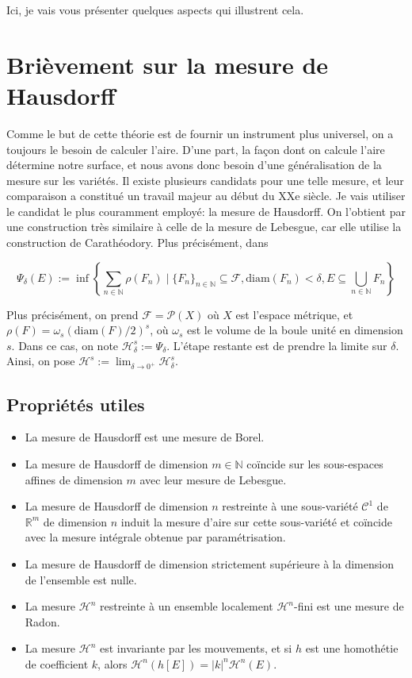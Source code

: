 \documentclass{article}
\begin{document}
\vspace{1ex}
Ici, je vais vous présenter quelques aspects qui illustrent cela.
\section{Brièvement sur la mesure de Hausdorff}
Comme le but de cette théorie est de fournir un instrument plus universel, on a
toujours le besoin de calculer l'aire. D'une part, la façon dont on calcule
l'aire détermine notre surface, et nous avons donc besoin d'une généralisation
de la mesure sur les variétés. Il existe plusieurs candidats pour une telle
mesure, et leur comparaison a constitué un travail majeur au début du XXe
siècle. Je vais utiliser le candidat le plus couramment employé: la mesure de
Hausdorff. On l'obtient par une construction très similaire à celle de la
mesure de Lebesgue, car elle utilise la construction de Carathéodory. Plus
précisément, dans

\[\Psi_\delta(E) := \inf\left\{\sum_{n\in\mathbb N}\rho(F_n)\;|\;\{F_n\}_{n\in
\mathbb N}\subseteq\mathcal F, \text{diam}(F_n)<\delta,
E\subseteq\bigcup_{n\in\mathbb N}F_n\right\} \]

Plus précisément, on prend $\mathcal F=\mathcal P(X)$ où $X$ est l'espace
métrique, et $\rho(F)=\omega_s(\text{diam}(F)/2)^s$, où $\omega_s$ est le volume
de la boule unité en dimension $s$. Dans ce cas, on note $\mathcal H_\delta^s:=
\Psi_\delta$. L'étape restante est de prendre la limite sur $\delta$. Ainsi, on
pose $\mathcal H^s := \lim_{\delta \rightarrow 0^+} \mathcal H^s_\delta$.

\subsection{Propriétés utiles}
\begin{itemize}
    \item La mesure de Hausdorff est une mesure de Borel.
    \item La mesure de Hausdorff de dimension $m \in \mathbb{N}$ coïncide sur
        les sous-espaces affines de dimension $m$ avec leur mesure de Lebesgue.
    \item La mesure de Hausdorff de dimension $n$ restreinte à une sous-variété
        $\mathcal{C}^1$ de $\mathbb{R}^m$ de dimension $n$ induit la mesure
        d'aire sur cette sous-variété et coïncide avec la mesure intégrale
        obtenue par paramétrisation.
    \item La mesure de Hausdorff de dimension strictement supérieure à la
        dimension de l'ensemble est nulle.
    \item La mesure $\mathcal H^n$ restreinte à un ensemble localement $\mathcal
        H^n$-fini est une mesure de Radon.
    \item La mesure $\mathcal{H}^n$ est invariante par les mouvements, et si
        $h$ est une homothétie de coefficient $k$, alors $\mathcal{H}^n(h[E])=
        |k|^n \mathcal{H}^n(E)$.
\end{itemize}
\end{document}
